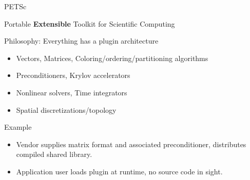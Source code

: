 \begin{frame}{PETSc}

\begin{center}Portable {\bf Extensible} Toolkit for Scientific Computing \end{center}

\begin{block}{Philosophy: Everything has a plugin architecture}
\begin{itemize}
  \item Vectors, Matrices, Coloring/ordering/partitioning algorithms
  \item Preconditioners, Krylov accelerators
  \item Nonlinear solvers, Time integrators
  \item Spatial discretizations/topology
\end{itemize}
\end{block}

\begin{block}{Example}
  \begin{itemize}
   \item Vendor supplies matrix format and associated preconditioner, distributes
	compiled shared library.  
   \item Application user loads plugin at runtime, no source
	code in sight.
  \end{itemize}
\end{block}
 \vspace{2cm}
\end{frame}


